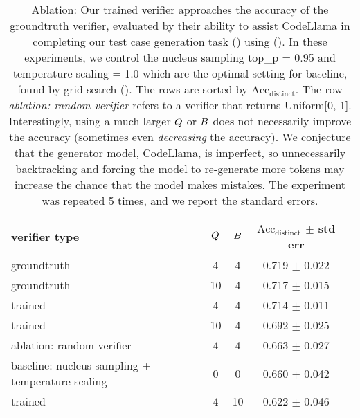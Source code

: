 \begin{table*}[h]
\begin{center}
\begin{small}
\begin{tabular}{ lcccc }
\toprule
\textbf{verifier type} & \textbf{$Q$} & \textbf{$B$} & \textbf{$\text{Acc}_\text{distinct}$ $\pm$ std err} \\
\hline
\hline
groundtruth & 4 & 4 & 0.719 $\pm$ 0.022 \\
\hline
groundtruth & 10 & 4 & 0.717 $\pm$ 0.015 \\
\hline
\hline
trained & 4 & 4 & 0.714 $\pm$ 0.011 \\
\hline
trained & 10 & 4 & 0.692 $\pm$ 0.025 \\
\hline
\hline
ablation: random verifier & 4 & 4  & 0.663 $\pm$ 0.027 \\
\hline
baseline: nucleus sampling + temperature scaling & 0 & 0  & 0.660 $\pm$ 0.042 \\
\hline
\hline
trained & 4 & 10 & 0.622 $\pm$ 0.046 \\
\bottomrule
\end{tabular}
\end{small}
\end{center}
\caption{
Ablation: 
Our trained verifier approaches the accuracy of the groundtruth verifier,
evaluated by their ability to assist CodeLlama in completing our test case generation task ()
using \algoName ().
In these experiments, we control the
nucleus sampling \citep{holtzman2020the} top\_p = 0.95 and temperature scaling = 1.0
which are the optimal setting for baseline, found by grid search ().
The rows are sorted by $\text{Acc}_\text{distinct}$.
The row \emph{ablation: random verifier} refers to 
a verifier that returns Uniform[0, 1].
Interestingly, using a much larger $Q$ or $B$ does not necessarily improve the accuracy (sometimes even \emph{decreasing} the accuracy).
We conjecture that the generator model, CodeLlama, is imperfect, 
so unnecessarily backtracking and forcing the model to re-generate more tokens may increase the chance that the model makes mistakes.
The experiment was repeated 5 times,
and we report the standard errors.
}
\label{table:codellama_groundtruth}
\end{table*}





